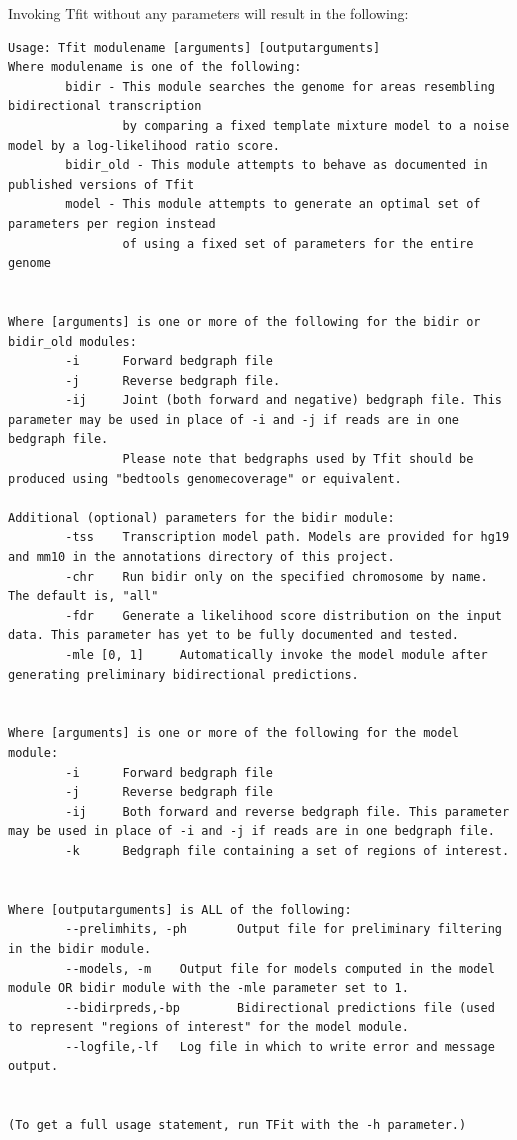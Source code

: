 \documentclass[12pt,letterpaper]{article}
\begin{document}
Invoking Tfit without any parameters will result in the following:
\begin{lstlisting}
Usage: Tfit modulename [arguments] [outputarguments]
Where modulename is one of the following:
        bidir - This module searches the genome for areas resembling bidirectional transcription
                by comparing a fixed template mixture model to a noise model by a log-likelihood ratio score.
        bidir_old - This module attempts to behave as documented in published versions of Tfit
        model - This module attempts to generate an optimal set of parameters per region instead 
                of using a fixed set of parameters for the entire genome


Where [arguments] is one or more of the following for the bidir or bidir_old modules:
        -i      Forward bedgraph file
        -j      Reverse bedgraph file.
        -ij     Joint (both forward and negative) bedgraph file. This parameter may be used in place of -i and -j if reads are in one bedgraph file.
                Please note that bedgraphs used by Tfit should be produced using "bedtools genomecoverage" or equivalent.

Additional (optional) parameters for the bidir module:
        -tss    Transcription model path. Models are provided for hg19 and mm10 in the annotations directory of this project.
        -chr    Run bidir only on the specified chromosome by name. The default is, "all"
        -fdr    Generate a likelihood score distribution on the input data. This parameter has yet to be fully documented and tested.
        -mle [0, 1]     Automatically invoke the model module after generating preliminary bidirectional predictions.


Where [arguments] is one or more of the following for the model module:
        -i      Forward bedgraph file
        -j      Reverse bedgraph file
        -ij     Both forward and reverse bedgraph file. This parameter may be used in place of -i and -j if reads are in one bedgraph file.
        -k      Bedgraph file containing a set of regions of interest.


Where [outputarguments] is ALL of the following:
        --prelimhits, -ph       Output file for preliminary filtering in the bidir module.
        --models, -m    Output file for models computed in the model module OR bidir module with the -mle parameter set to 1.
        --bidirpreds,-bp        Bidirectional predictions file (used to represent "regions of interest" for the model module.
        --logfile,-lf   Log file in which to write error and message output.


(To get a full usage statement, run TFit with the -h parameter.)
\end{lstlisting}
\end{document}
